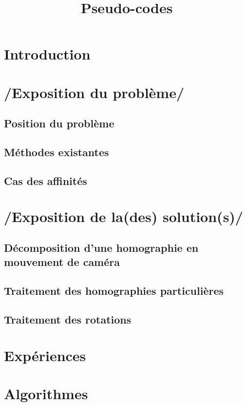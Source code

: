 \documentclass[a4paper,11pt]{article}
\title{Pseudo-codes}
\begin{document}
	\maketitle
	\tableofcontents
	
	\section*{Introduction}
		
	\section{/Exposition du problème/}
		\subsection{Position du problème}
			
		\subsection{Méthodes existantes}
			
		\subsection{Cas des affinités}
			
	\section{/Exposition de la(des) solution(s)/}
		\subsection{Décomposition d'une homographie en mouvement de caméra}
			
		\subsection{Traitement des homographies particulières}
			
		\subsection{Traitement des rotations}
			
	\section{Expériences}
		
	\appendix
	\section{Algorithmes}
		
\end{document}
